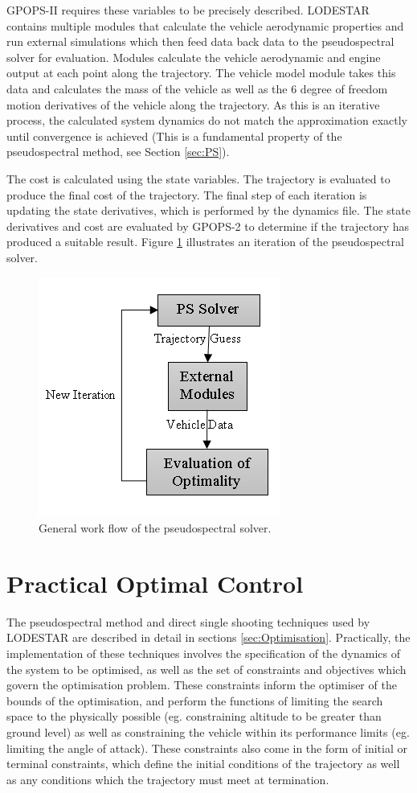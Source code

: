 GPOPS-II requires these variables to be precisely described. LODESTAR contains multiple modules that calculate the vehicle aerodynamic properties and run external simulations which then feed data back data to the pseudospectral solver for evaluation. Modules calculate the vehicle aerodynamic and engine output at each point along the trajectory. The vehicle model module takes this data and calculates the mass of the vehicle as well as the 6 degree of freedom motion derivatives of the vehicle along the trajectory. As this is an iterative process, the calculated system dynamics do not match the approximation exactly until convergence is achieved (This is a fundamental property of the pseudospectral method, see Section \ref{sec:PS}). 

The cost is calculated using the state variables. The trajectory is evaluated to produce the final cost of the trajectory. The final step of each iteration is updating the state derivatives, which is performed by the dynamics file. The state derivatives and cost are evaluated by GPOPS-2 to determine if the trajectory has produced a suitable result. Figure \ref{fig:FlowChartSmall} illustrates an iteration of the pseudospectral solver.

\begin{figure}
	\centering
	\includegraphics[width=0.5\linewidth]{figures/4_LODESTAR/FlowChartSmall}
	\caption{General work flow of the pseudospectral solver.}
	\label{fig:FlowChartSmall}
\end{figure}


\section{Practical Optimal Control}
The pseudospectral method and direct single shooting techniques used by LODESTAR are described in detail in sections \ref{sec:Optimisation}. Practically, the implementation of these techniques involves the specification of the dynamics of the system to be optimised, as well as the set of constraints and objectives which govern the optimisation problem. These constraints inform the optimiser of the bounds of the optimisation, and perform the functions of limiting the search space to the physically possible (eg. constraining altitude to be greater than ground level) as well as constraining the vehicle within its performance limits (eg. limiting the angle of attack). These constraints also come in the form of initial or terminal constraints, which define the initial conditions of the trajectory as well as any conditions which the trajectory must meet at termination. 

